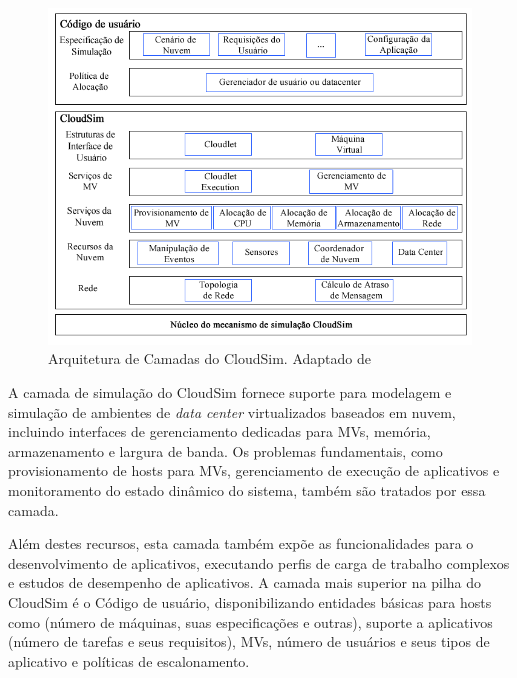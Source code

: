 \documentclass[tcc,capa]{texufpel}
\begin{document}
\begin{figure}[!htb]
   \centering
    \includegraphics[scale = 0.9]{images/arquiteturaCloudSimPtBr.png}
    \caption{Arquitetura de Camadas do CloudSim. Adaptado de  \cite{calheiros2011cloudsim}}
    \label{fig:cloudsimarchitecture}
\end{figure}

A camada de simulação do CloudSim fornece suporte para modelagem e simulação de ambientes de \textit{data center} virtualizados baseados em nuvem, incluindo interfaces de gerenciamento dedicadas para MVs, memória, armazenamento e largura de banda. Os problemas fundamentais, como provisionamento de hosts para MVs, gerenciamento de execução de aplicativos e monitoramento do estado dinâmico do sistema, também são tratados por essa camada.

Além destes recursos, esta camada também expõe as funcionalidades para o desenvolvimento de aplicativos, executando perfis de carga de trabalho complexos e estudos de desempenho de aplicativos. A camada mais superior na pilha do CloudSim é o Código de usuário, disponibilizando entidades básicas para hosts como (número de máquinas, suas especificações e outras), suporte a aplicativos (número de tarefas e seus requisitos), MVs, número de usuários e seus tipos de aplicativo e políticas de escalonamento.

\end{document}
